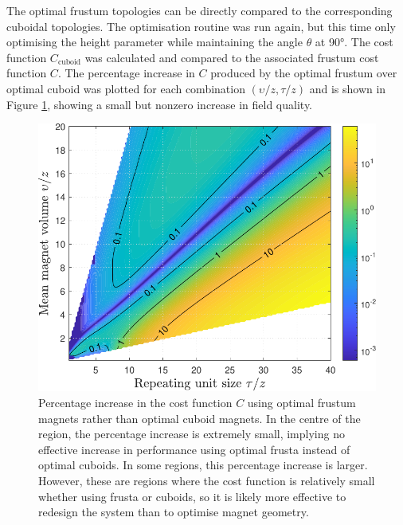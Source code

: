The optimal frustum topologies can be directly compared to the corresponding cuboidal topologies. The optimisation routine was run again, but this time only optimising the height parameter while maintaining the angle \(\theta\) at \ang{90}. The cost function \(C_\text{cuboid}\) was calculated and compared to the associated frustum cost function \(C\). The percentage increase in \(C\) produced by the optimal frustum over optimal cuboid was plotted for each combination \(\left( \upsilon/z, \tau/z \right)\) and is shown in Figure \ref{fig:p3percentageIncrease}, showing a small but nonzero increase in field quality.
\begin{figure}
	\centering
	\includegraphics[width=0.8\linewidth]{p3/p3FIG16}
	\caption{Percentage increase in the cost function \(C\) using optimal frustum magnets rather than optimal cuboid magnets. In the centre of the region, the percentage increase is extremely small, implying no effective increase in performance using optimal frusta instead of optimal cuboids. In some regions, this percentage increase is larger. However, these are regions where the cost function is relatively small whether using frusta or cuboids, so it is likely more effective to redesign the system than to optimise magnet geometry.}
	\label{fig:p3percentageIncrease}
\end{figure}

